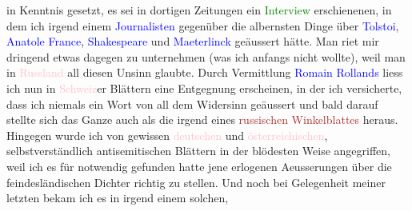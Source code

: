                     in Kenntnis gesetzt, es sei in dortigen Zeitungen ein \textcolor{green}{Interview}{} erschienenen, in dem ich irgend
                    einem \textcolor{blue}{Journalisten}{}
                    gegenüber die albernsten Dinge über \textcolor{blue}{Tolstoi}{}\ledrightnote{\textcolor{blue}{Leo N. von Tolstoi}},
                        \textcolor{blue}{Anatole France}{}\ledrightnote{\textcolor{blue}{Anatole France}}, \textcolor{blue}{Shakespeare}{}\ledrightnote{\textcolor{blue}{William Shakespeare}} und \textcolor{blue}{Maeterlin\introOben{}c\introOben{}k}{}\ledrightnote{\textcolor{blue}{Maurice Maeterlinck}} geäussert hätte. Man riet
                    mir dringend etwas dagegen zu unternehmen (was ich anfangs nicht wollte), weil
                    man in \textcolor{pink}{Russland}{}\ledrightnote{\textcolor{pink}{Russland}} all diesen Unsinn glaubte.
                    Durch Vermittlung \textcolor{blue}{Romain Rollands}{}\ledrightnote{\textcolor{blue}{Romain Rolland}} liess ich
                    nun in \textcolor{pink}{Schweiz}{}\ledrightnote{\textcolor{pink}{Schweiz}}er Blättern eine Entgegnung
                        erschei{\pb}nen, in der ich versicherte, dass
                    ich niemals ein Wort von all dem Widersinn geäussert und bald darauf stellte
                    sich das Ganze auch als die \label{K_L02224_1v}\label{K_L02224_1h} irgend eines \textcolor{brown}{russischen Winkelblattes}{} heraus. Hingegen wurde ich von gewissen \textcolor{pink}{deutschen}{}\ledrightnote{\textcolor{pink}{Deutschland}} und \textcolor{pink}{österreichischen}{}\ledrightnote{\textcolor{pink}{Österreich}}, selbstverständlich antisemitischen Blättern in der
                    blödesten Weise angegriffen, weil ich es für notwendig gefunden hatte jene
                    erlogenen Aeusserungen über die feindesländischen Dichter richtig zu stellen.
                    Und noch bei Gelegenheit meiner letzten \label{K_L02224_2v}\label{K_L02224_2h} bekam ich es in irgend einem solchen,
